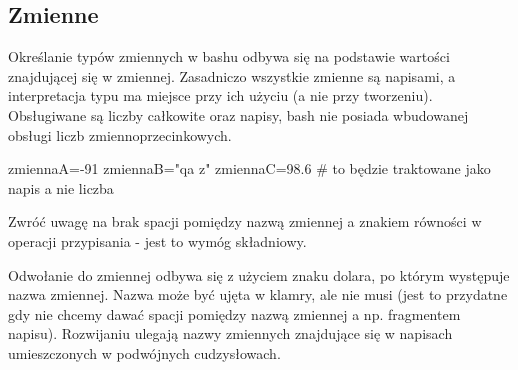 % 
% 
% 
% 


\subsection{Zmienne}

Określanie typów zmiennych w bashu odbywa się na podstawie wartości znajdującej się w zmiennej.
Zasadniczo wszystkie zmienne są napisami, a interpretacja typu ma miejsce przy ich użyciu (a nie przy tworzeniu).
Obsługiwane są liczby całkowite oraz napisy, bash nie posiada wbudowanej obsługi liczb zmiennoprzecinkowych.

\begin{CodeFrame*}[bash]{}
zmiennaA=-91
zmiennaB="qa z"
zmiennaC=98.6 # to będzie traktowane jako napis a nie liczba
\end{CodeFrame*}
Zwróć uwagę na brak spacji pomiędzy nazwą zmiennej a znakiem równości w operacji przypisania - jest to wymóg składniowy.

Odwołanie do zmiennej odbywa się z użyciem znaku dolara, po którym występuje nazwa zmiennej. Nazwa może być ujęta w klamry, ale nie musi (jest to przydatne gdy nie chcemy dawać spacji pomiędzy nazwą zmiennej a np. fragmentem napisu). Rozwijaniu ulegają nazwy zmiennych znajdujące się w napisach umieszczonych w podwójnych cudzysłowach.

